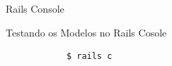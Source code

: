 \documentclass{beamer}
\begin{document}
\begin{frame}[fragile]{Rails Console}
	\begin{block} {\LARGE Testando os Modelos no Rails Cosole}
		\begin{verbatim}
			$ rails c
		\end{verbatim}
	\end{block}
\end{frame}

%    
%    
%
% 
%    
%
\end{document}
